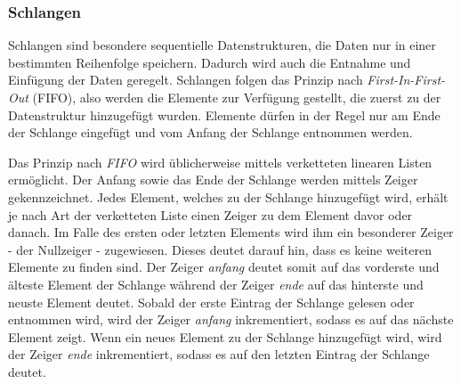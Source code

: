 \subsubsection{Schlangen}
Schlangen sind besondere sequentielle Datenstrukturen, die Daten nur in einer bestimmten Reihenfolge speichern. Dadurch wird auch die Entnahme und Einfügung der Daten geregelt. Schlangen folgen das Prinzip nach \textit{First-In-First-Out} (FIFO), also werden die Elemente zur Verfügung gestellt, die zuerst zu der Datenstruktur hinzugefügt wurden. Elemente dürfen in der Regel nur am Ende der Schlange eingefügt und vom Anfang der Schlange entnommen werden. \autocite[371]{gumm_band_2016}

Das Prinzip nach \textit{FIFO} wird üblicherweise mittels verketteten linearen Listen ermöglicht. Der Anfang sowie das Ende der Schlange werden mittels Zeiger gekennzeichnet. Jedes Element, welches zu der Schlange hinzugefügt wird, erhält je nach Art der verketteten Liste einen Zeiger zu dem Element davor oder danach. Im Falle des ersten oder letzten Elements wird ihm ein besonderer Zeiger - der Nullzeiger - zugewiesen. Dieses deutet darauf hin, dass es keine weiteren Elemente zu finden sind. Der Zeiger \textit{anfang} deutet somit auf das vorderste und älteste Element der Schlange während der Zeiger \textit{ende} auf das hinterste und neuste Element deutet. Sobald der erste Eintrag der Schlange gelesen oder entnommen wird, wird der Zeiger \textit{anfang} inkrementiert, sodass es auf das nächste Element zeigt. Wenn ein neues Element zu der Schlange hinzugefügt wird, wird der Zeiger \textit{ende} inkrementiert, sodass es auf den letzten Eintrag der Schlange deutet. \autocite[48-49]{ollmert_datenstrukturen_2020} \autocite[371]{gumm_band_2016}

